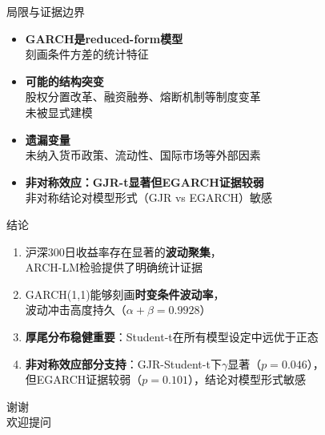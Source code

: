 \documentclass[10pt,aspectratio=169]{beamer}
\begin{document}
\begin{frame}{局限与证据边界}
  \begin{itemize}
    \item \textbf{GARCH是reduced-form模型}\\
    刻画条件方差的统计特征
    \item \textbf{可能的结构突变}\\
    股权分置改革、融资融券、熔断机制等制度变革\\
    未被显式建模
    \item \textbf{遗漏变量}\\
    未纳入货币政策、流动性、国际市场等外部因素
    \item \textbf{非对称效应：GJR-t显著但EGARCH证据较弱}\\
    非对称结论对模型形式（GJR vs EGARCH）敏感
  \end{itemize}
\end{frame}

\begin{frame}{结论}
  \begin{enumerate}
    \item 沪深300日收益率存在显著的\textbf{波动聚集}，\\
    ARCH-LM检验提供了明确统计证据
    \item GARCH(1,1)能够刻画\textbf{时变条件波动率}，\\
    波动冲击高度持久（$\alpha+\beta=0.9928$）
    \item \textbf{厚尾分布稳健重要}：Student-t在所有模型设定中远优于正态
    \item \textbf{非对称效应部分支持}：GJR-Student-t下$\gamma$显著（$p=0.046$），\\
    但EGARCH证据较弱（$p=0.101$），结论对模型形式敏感
  \end{enumerate}
\end{frame}

\begin{frame}
  \begin{center}
    \Huge 谢谢\\[1em]
    \Large 欢迎提问
  \end{center}
\end{frame}
\end{document}
